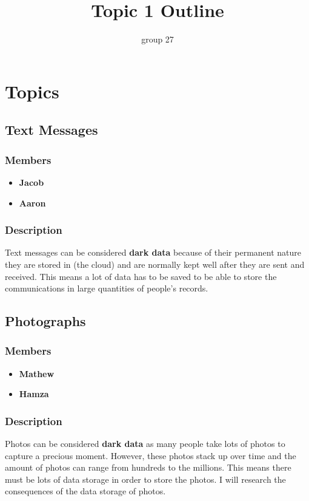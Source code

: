 \documentclass{article}
\begin{document}
\title{Topic 1 Outline}
\author{group 27}

\maketitle
\newpage

\section{Topics}
    \subsection{Text Messages} 
        \subsubsection{Members}
        \begin{itemize}
            \item \textbf{Jacob}
            \item \textbf{Aaron}
        \end{itemize}
        \subsubsection{Description}
        Text messages can be considered \textbf{dark data} because of their permanent nature they are stored in (the cloud) and 
        are normally kept well after they are sent and received. This means a lot of data has to be saved to be able to
        store the communications in large quantities of people's records. 

    \subsection{Photographs}
        \subsubsection{Members}
        \begin{itemize}
            \item \textbf{Mathew}
            \item \textbf{Hamza}
        \end{itemize}
        \subsubsection{Description}
        Photos can be considered \textbf{dark data} as many people take lots of photos to capture a precious moment. However, these photos stack up over time and the amount of photos can range from hundreds to the millions. This means there must be lots of data storage in order to store the photos.
        I will research the consequences of the data storage of photos.
\end{document}
